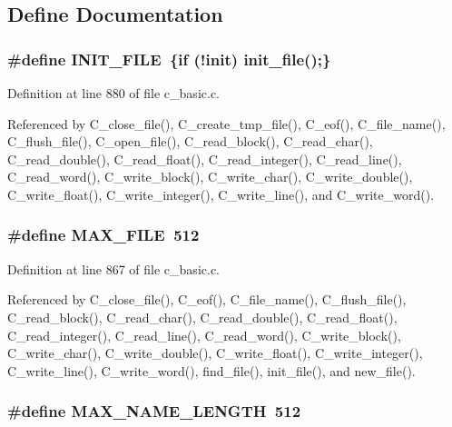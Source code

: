 \subsection{Define Documentation}
\subsubsection{\setlength{\rightskip}{0pt plus 5cm}\#define INIT\_\-FILE~\{if (!\bf{init}) init\_\-file();\}}\label{c__basic_8c_b4c2978fc4ab68d56c0111b042cddf08}




Definition at line 880 of file c\_\-basic.c.

Referenced by C\_\-close\_\-file(), C\_\-create\_\-tmp\_\-file(), C\_\-eof(), C\_\-file\_\-name(), C\_\-flush\_\-file(), C\_\-open\_\-file(), C\_\-read\_\-block(), C\_\-read\_\-char(), C\_\-read\_\-double(), C\_\-read\_\-float(), C\_\-read\_\-integer(), C\_\-read\_\-line(), C\_\-read\_\-word(), C\_\-write\_\-block(), C\_\-write\_\-char(), C\_\-write\_\-double(), C\_\-write\_\-float(), C\_\-write\_\-integer(), C\_\-write\_\-line(), and C\_\-write\_\-word().
\subsubsection{\setlength{\rightskip}{0pt plus 5cm}\#define MAX\_\-FILE~512}\label{c__basic_8c_19d34ae55fb2e29df830c11df2219da8}




Definition at line 867 of file c\_\-basic.c.

Referenced by C\_\-close\_\-file(), C\_\-eof(), C\_\-file\_\-name(), C\_\-flush\_\-file(), C\_\-read\_\-block(), C\_\-read\_\-char(), C\_\-read\_\-double(), C\_\-read\_\-float(), C\_\-read\_\-integer(), C\_\-read\_\-line(), C\_\-read\_\-word(), C\_\-write\_\-block(), C\_\-write\_\-char(), C\_\-write\_\-double(), C\_\-write\_\-float(), C\_\-write\_\-integer(), C\_\-write\_\-line(), C\_\-write\_\-word(), find\_\-file(), init\_\-file(), and new\_\-file().
\subsubsection{\setlength{\rightskip}{0pt plus 5cm}\#define MAX\_\-NAME\_\-LENGTH~512}\label{c__basic_8c_0c397a708cec89c74029582574516b30}




